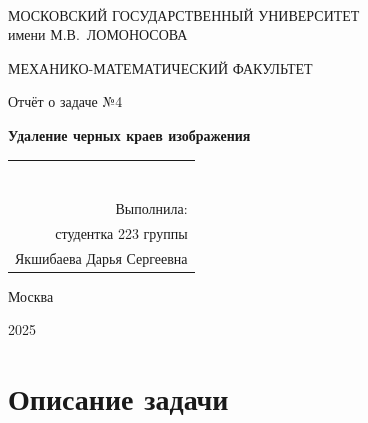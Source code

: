 \documentclass[a4paper, 12pt]{article}
\theoremstyle{mytheoremstyle}
\theoremstyle{myremarkstyle}
\numberwithin{equation}{section}
\begin{document}
{\fontsize{14pt}{18}\selectfont
  
  \thispagestyle{empty}
  \begin{center}
		
		\vfill\vfill \ \\ {%
			МОСКОВСКИЙ ГОСУДАРСТВЕННЫЙ УНИВЕРСИТЕТ \\
			имени М.В.~ЛОМОНОСОВА
			
			\medskip
			
			МЕХАНИКО-МАТЕМАТИЧЕСКИЙ ФАКУЛЬТЕТ


		}



{%
	\vfill\vfill\vfill\vfill\vfill\vfill\vfill {%
   
		Отчёт о задаче №4
		
	}
		
		
		\vfill{\Large
        
			\textbf{Удаление черных краев изображения} 
		}
		
			

			\vfill
			\begin{flushright}
				\begin{tabular}{r}
                \\
                \\
                \\
                \\
                \\
                \\
                \\
                \\
                
					Выполнила:\\
студентка 223 группы \\
Якшибаева Дарья Сергеевна
					
				\end{tabular}
			\end{flushright}
			
		}
		
		\vfill\vfill\vfill\vfill 
		
		Москва
		
		 2025
	\end{center}
}

    \newpage
    \tableofcontents
    \fontsize{14pt}{20pt}\selectfont
    \newpage
\pagestyle{plain}

\section{Описание задачи}
\end{document}
